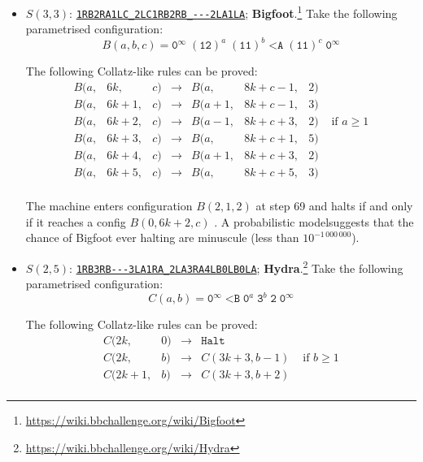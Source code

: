 \documentclass[letterpaper,british,11pt]{article}
\theoremstyle{definition} %
\numberwithin{equation}{section}
\theoremstyle{definition} %
\newcommand{\tm}[1]{\href{https://bbchallenge.org/#1}{\texttt{\nolinkurl{#1}}}}
\newcommand{\szero}{\texttt{0}\xspace}
\newcommand{\sone}{\texttt{1}\xspace}
\begin{document}
\begin{itemize}
    \item $S(3,3)$: \tm{1RB2RA1LC_2LC1RB2RB_---2LA1LA}; \textbf{Bigfoot}.\footnote{\label{note:bigfoot}\url{https://wiki.bbchallenge.org/wiki/Bigfoot}} Take the following parametrised configuration:
          $$B(a,b,c) = \szero^\infty\; (\sone \texttt{2})^a \; (\sone \sone)^b \; \texttt{<A} \; (\sone \sone)^c \; \szero^\infty$$

          The following Collatz-like rules can be proved:
          \[
              \begin{array}{lllcllll}
                  B(a, & 6k,   & c) & \to & B(a,   & 8k + c - 1, & 2)                        \\
                  B(a, & 6k+1, & c) & \to & B(a+1, & 8k + c - 1, & 3)                        \\
                  B(a, & 6k+2, & c) & \to & B(a-1, & 8k + c + 3, & 2) & \text{ if } a \geq 1 \\
                  B(a, & 6k+3, & c) & \to & B(a,   & 8k + c + 1, & 5)                        \\
                  B(a, & 6k+4, & c) & \to & B(a+1, & 8k + c + 3, & 2)                        \\
                  B(a, & 6k+5, & c) & \to & B(a,   & 8k + c + 5, & 3)                        \\
              \end{array}
          \]

          The machine enters configuration $B(2,1,2)$ at step 69 and halts if and only if it reaches a config $B(0,6k+2,c)$ \cite{ligocki2023bb33}. A probabilistic model suggests that the chance of Bigfoot ever halting are minuscule (less than $10^{-1\,000\,000}$).

    \item $S(2,5)$: \tm{1RB3RB---3LA1RA_2LA3RA4LB0LB0LA}; \textbf{Hydra}.\footnote{\label{note:hydra}\url{https://wiki.bbchallenge.org/wiki/Hydra}} Take the following parametrised configuration:
          $$C(a,b) = \szero^\infty \; \texttt{<B} \; \szero^a \; \texttt{3}^b \; \texttt{2} \; \szero^\infty$$

          The following Collatz-like rules can be proved:
          \[
              \begin{array}{llcll}
                  C(2k,   & 0) & \longrightarrow & \texttt{Halt}                        \\
                  C(2k,   & b) & \longrightarrow & C(3k+3, b-1)  & \text{ if } b \geq 1 \\
                  C(2k+1, & b) & \longrightarrow & C(3k+3, b+2)                         \\
              \end{array}
          \]


\end{itemize}
\end{document}
